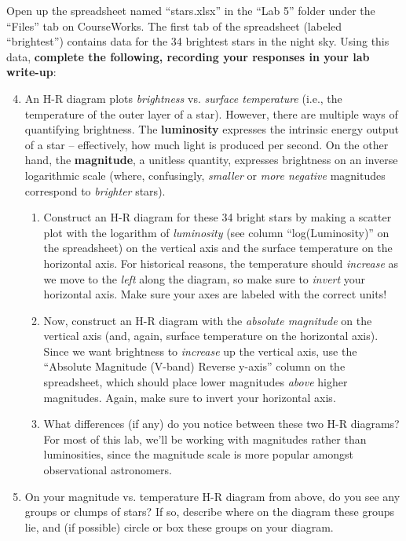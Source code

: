\documentclass[11pt]{article}
\begin{document}
Open up the spreadsheet named ``stars.xlsx'' in the ``Lab 5'' folder under the ``Files'' tab on CourseWorks. The first tab of the spreadsheet (labeled ``brightest'') contains data for the 34 brightest stars in the night sky. Using this data, \textbf{complete the following, recording your responses in your lab write-up}:
\begin{enumerate}
    \setcounter{enumi}{3}
    
    \item An H-R diagram plots \emph{brightness} vs. \emph{surface temperature} (i.e., the temperature of the outer layer of a star). However, there are multiple ways of quantifying brightness. The \textbf{luminosity} expresses the intrinsic energy output of a star -- effectively, how much light is produced per second. On the other hand, the \textbf{magnitude}, a unitless quantity, expresses brightness on an inverse logarithmic scale (where, confusingly, \emph{smaller} or \emph{more negative} magnitudes correspond to \emph{brighter} stars).
    \begin{enumerate}
        \item Construct an H-R diagram for these 34 bright stars by making a scatter plot with the logarithm of \emph{luminosity} (see column ``log(Luminosity)'' on the spreadsheet) on the vertical axis and the surface temperature on the horizontal axis. For historical reasons, the temperature should \emph{increase} as we move to the \emph{left} along the diagram, so make sure to \emph{invert} your horizontal axis. Make sure your axes are labeled with the correct units!
        
        \item Now, construct an H-R diagram with the \emph{absolute magnitude} on the vertical axis (and, again, surface temperature on the horizontal axis). Since we want brightness to \emph{increase} up the vertical axis, use the ``Absolute Magnitude (V-band) Reverse y-axis'' column on the spreadsheet, which should place lower magnitudes \emph{above} higher magnitudes. Again, make sure to invert your horizontal axis.
        
        \item What differences (if any) do you notice between these two H-R diagrams? For most of this lab, we'll be working with magnitudes rather than luminosities, since the magnitude scale is more popular amongst observational astronomers.
    \end{enumerate}
    
    \item On your magnitude vs. temperature H-R diagram from above, do you see any groups or clumps of stars? If so, describe where on the diagram these groups lie, and (if possible) circle or box these groups on your diagram.
    

\end{enumerate}
\end{document}
